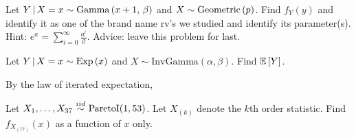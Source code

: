 \documentclass[12pt]{article}
\begin{document}
\begin{enumerate}[(a)]


 Let $Y\,|\,X = x \sim \mathrm{Gamma}\left(x + 1,\,\beta\right)$ and $X \sim \mathrm{Geometric}\left(p\right)$. Find $f_Y(y)$ and identify it as one of the brand name rv's we studied and identify its parameter(s). Hint: $e^{a} = \displaystyle \sum_{i=0}^\infty \frac{a^i}{i!}$. Advice: leave this problem for last. 


\pagebreak
{} Let $Y\,|\,X = x \sim \mathrm{Exp}\left(x\right)$ and $X \sim \text{InvGamma}(\alpha,\beta)$. Find $\mathbb{E}\left[Y\right]$.

By the law of iterated expectation,


 Let $X_1, \ldots, X_{37} \iid \text{ParetoI}(1,53)$. Let $X_{(k)}$ denote the $k$th order statistic. Find $f_{X_{(17)}}(x)$ as a function of $x$ only. 


\end{enumerate}
\end{document}
